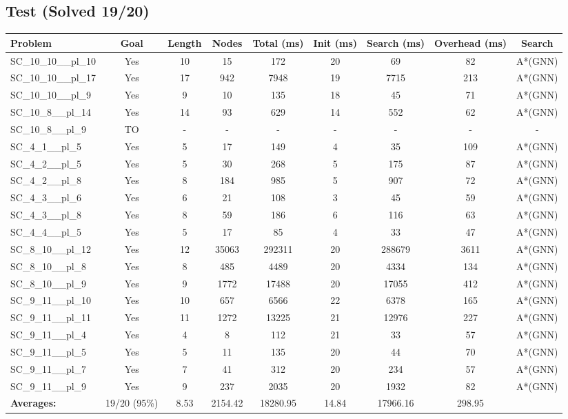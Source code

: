 \documentclass{article}
\begin{document}
\subsection*{Test (Solved 19/20)}
\begin{tabular}{lcccccccc}
\toprule
Problem & Goal & Length & Nodes & Total (ms) & Init (ms) & Search (ms) & Overhead (ms) & Search \\
\midrule
SC\_10\_10\_\_pl\_10 & Yes & 10 & 15 & 172 & 20 & 69 & 82 & A*(GNN) \\
SC\_10\_10\_\_pl\_17 & Yes & 17 & 942 & 7948 & 19 & 7715 & 213 & A*(GNN) \\
SC\_10\_10\_\_pl\_9 & Yes & 9 & 10 & 135 & 18 & 45 & 71 & A*(GNN) \\
SC\_10\_8\_\_pl\_14 & Yes & 14 & 93 & 629 & 14 & 552 & 62 & A*(GNN) \\
SC\_10\_8\_\_pl\_9 & TO & - & - & - & - & - & - & - \\
SC\_4\_1\_\_pl\_5 & Yes & 5 & 17 & 149 & 4 & 35 & 109 & A*(GNN) \\
SC\_4\_2\_\_pl\_5 & Yes & 5 & 30 & 268 & 5 & 175 & 87 & A*(GNN) \\
SC\_4\_2\_\_pl\_8 & Yes & 8 & 184 & 985 & 5 & 907 & 72 & A*(GNN) \\
SC\_4\_3\_\_pl\_6 & Yes & 6 & 21 & 108 & 3 & 45 & 59 & A*(GNN) \\
SC\_4\_3\_\_pl\_8 & Yes & 8 & 59 & 186 & 6 & 116 & 63 & A*(GNN) \\
SC\_4\_4\_\_pl\_5 & Yes & 5 & 17 & 85 & 4 & 33 & 47 & A*(GNN) \\
SC\_8\_10\_\_pl\_12 & Yes & 12 & 35063 & 292311 & 20 & 288679 & 3611 & A*(GNN) \\
SC\_8\_10\_\_pl\_8 & Yes & 8 & 485 & 4489 & 20 & 4334 & 134 & A*(GNN) \\
SC\_8\_10\_\_pl\_9 & Yes & 9 & 1772 & 17488 & 20 & 17055 & 412 & A*(GNN) \\
SC\_9\_11\_\_pl\_10 & Yes & 10 & 657 & 6566 & 22 & 6378 & 165 & A*(GNN) \\
SC\_9\_11\_\_pl\_11 & Yes & 11 & 1272 & 13225 & 21 & 12976 & 227 & A*(GNN) \\
SC\_9\_11\_\_pl\_4 & Yes & 4 & 8 & 112 & 21 & 33 & 57 & A*(GNN) \\
SC\_9\_11\_\_pl\_5 & Yes & 5 & 11 & 135 & 20 & 44 & 70 & A*(GNN) \\
SC\_9\_11\_\_pl\_7 & Yes & 7 & 41 & 312 & 20 & 234 & 57 & A*(GNN) \\
SC\_9\_11\_\_pl\_9 & Yes & 9 & 237 & 2035 & 20 & 1932 & 82 & A*(GNN) \\
\textbf{Averages:} & 19/20 (95\%) & 8.53 & 2154.42 & 18280.95 & 14.84 & 17966.16 & 298.95 & \\
\bottomrule
\end{tabular}
\\[0.7cm]
\end{document}
